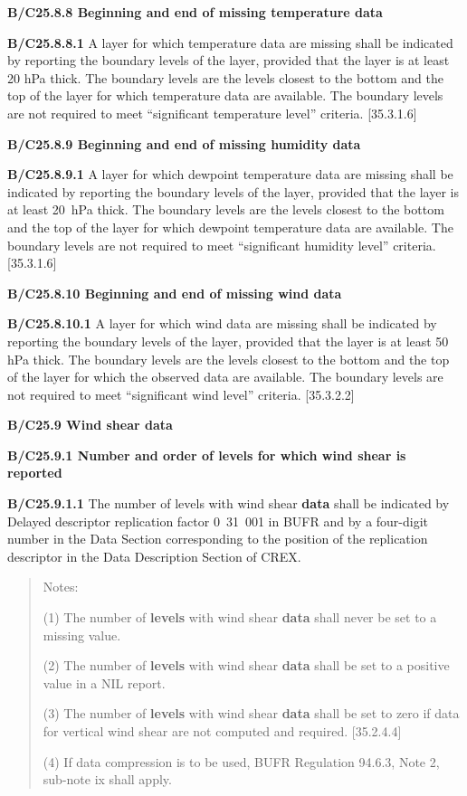 \textbf{B/C25.8.8 Beginning and end of missing temperature data}

\textbf{B/C25.8.8.1} A layer for which temperature data are missing shall be indicated by reporting the boundary levels of the layer, provided that the layer is at least 20 hPa thick. The boundary levels are the levels closest to the bottom and the top of the layer for which temperature data are available. The boundary levels are not required to meet ``significant temperature level'' criteria. {[}35.3.1.6{]}

\textbf{B/C25.8.9 Beginning and end of missing humidity data}

\textbf{B/C25.8.9.1} A layer for which dewpoint temperature data are missing shall be indicated by reporting the boundary levels of the layer, provided that the layer is at least 20~hPa thick. The boundary levels are the levels closest to the bottom and the top of the layer for which dewpoint temperature data are available. The boundary levels are not required to meet ``significant humidity level'' criteria. {[}35.3.1.6{]}

\textbf{B/C25.8.10 Beginning and end of missing wind data}

\textbf{B/C25.8.10.1} A layer for which wind data are missing shall be indicated by reporting the boundary levels of the layer, provided that the layer is at least 50 hPa thick. The boundary levels are the levels closest to the bottom and the top of the layer for which the observed data are available. The boundary levels are not required to meet ``significant wind level'' criteria. {[}35.3.2.2{]}

\textbf{B/C25.9 Wind shear data}

\textbf{B/C25.9.1 Number and order of levels for which wind shear is reported}

\textbf{B/C25.9.1.1} The number of levels with wind shear \textbf{data} shall be indicated by Delayed descriptor replication factor 0~31~001 in BUFR and by a four-digit number in the Data Section corresponding to the position of the replication descriptor in the Data Description Section of CREX.

\begin{quote}
Notes:

(1) The number of \textbf{levels} with wind shear \textbf{data} shall never be set to a missing value.

(2) The number of \textbf{levels} with wind shear \textbf{data} shall be set to a positive value in a NIL report.

(3) The number of \textbf{levels} with wind shear \textbf{data} shall be set to zero if data for vertical wind shear are not computed and required. {[}35.2.4.4{]}

(4) If data compression is to be used, BUFR Regulation 94.6.3, Note 2, sub-note ix shall apply.
\end{quote}

